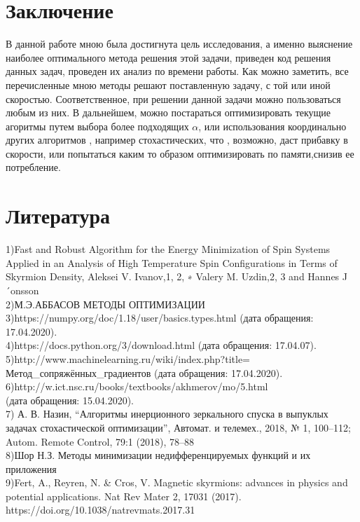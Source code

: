 \documentclass[ 12pt,x11names]{article}
\begin{document}
    \section{Заключение}
    В данной работе мною была достигнута цель исследования, а именно выяснение наиболее оптимального метода решения этой задачи, приведен  код решения данных задач, проведен их анализ по времени работы.
    Как можно заметить, все перечисленные мною методы решают поставленную задачу, с той или иной скоростью. Соответственное, при решении данной задачи можно пользоваться любым из них.
    В дальнейшем, можно постараться оптимизировать текущие агоритмы  путем выбора более подходящих $\alpha$, или использования координально других алгоритмов , например стохастических, что , возможно, даст прибавку в скорости, или попытаться каким то образом оптимизировать по памяти,снизив ее потребление.
\newpage
\section{Литература}
1)Fast and Robust Algorithm for the Energy Minimization of Spin Systems Applied in
an Analysis of High Temperature Spin Configurations in Terms of Skyrmion Density, Aleksei V. Ivanov,1, 2, ∗ Valery M. Uzdin,2, 3 and Hannes J´onsson\\
2)М.Э.АББАСОВ
МЕТОДЫ ОПТИМИЗАЦИИ\\
3)https://numpy.org/doc/1.18/user/basics.types.html (дата обращения: 17.04.2020).\\
4)https://docs.python.org/3/download.html (дата обращения: 17.04.07).\\
5)http://www.machinelearning.ru/wiki/index.php?title=\\
Метод\_сопряжённых\_градиентов (дата обращения: 17.04.2020).\\
6)http://w.ict.nsc.ru/books/textbooks/akhmerov/mo/5.html\\
(дата обращения: 15.04.2020).\\
7)  А. В. Назин, “Алгоритмы инерционного зеркального спуска в выпуклых задачах стохастической оптимизации”, Автомат. и телемех., 2018, № 1, 100–112; Autom. Remote Control, 79:1 (2018), 78–88\\
8)Шор Н.З. Методы минимизации недифференцируемых функций и их приложения\\
9)Fert, A., Reyren, N. & Cros, V. Magnetic skyrmions: advances in physics and potential applications. Nat Rev Mater 2, 17031 (2017).\\ https://doi.org/10.1038/natrevmats.2017.31
\end{document}
